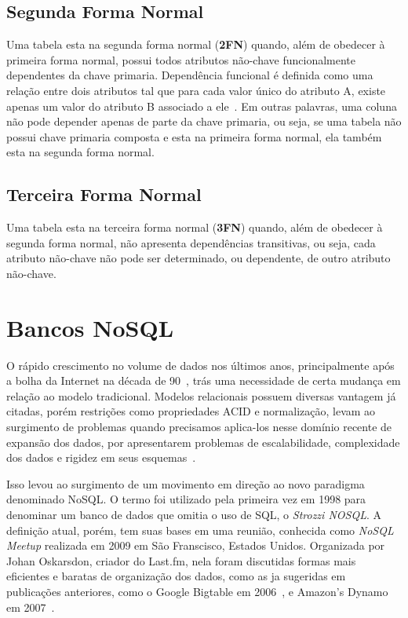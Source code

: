 \subsection*{Segunda Forma Normal}
	Uma tabela esta na segunda forma normal (\textbf{2FN}) quando, além de obedecer à primeira forma normal, possui todos atributos não-chave funcionalmente dependentes da chave primaria. Dependência funcional é definida como uma relação entre dois atributos tal que para cada valor único do atributo A, existe apenas um valor do atributo B associado a ele~\cite{jan}. Em outras palavras, uma coluna não pode depender apenas de parte da chave primaria, ou seja, se uma tabela não possui chave primaria composta e esta na primeira forma normal, ela também esta na segunda forma normal.
	
\subsection*{Terceira Forma Normal}
	Uma tabela esta na terceira forma normal (\textbf{3FN}) quando, além de obedecer à segunda forma normal, não apresenta dependências transitivas, ou seja, cada atributo não-chave não pode ser determinado, ou dependente, de outro atributo não-chave. 

\section{Bancos NoSQL}
    O rápido crescimento no volume de dados nos últimos anos, principalmente após a bolha da Internet na década de 90~\cite{pramod}, trás uma necessidade de certa mudança em relação ao modelo tradicional. Modelos relacionais possuem diversas vantagem já citadas, porém restrições como propriedades ACID e normalização, levam ao surgimento de problemas quando precisamos aplica-los nesse domínio recente de expansão dos dados, por apresentarem problemas de escalabilidade, complexidade dos dados e rigidez em seus esquemas~\cite{leavitt2010nosql}. 
    
    Isso levou ao surgimento de um movimento em direção ao novo paradigma denominado NoSQL. O termo foi utilizado pela primeira vez em 1998 para denominar um banco de dados que omitia o uso de SQL, o \emph{Strozzi NOSQL}. A definição atual, porém, tem suas bases em uma reunião, conhecida como \emph{NoSQL Meetup} realizada em 2009 em São Franscisco, Estados Unidos. Organizada por Johan Oskarsdon, criador do Last.fm, nela foram discutidas formas mais eficientes e baratas de organização dos dados, como as ja sugeridas em publicações anteriores, como o Google Bigtable em 2006~\cite{bigtable}, e Amazon's Dynamo em 2007~\cite{dynamo, chrisnosql}.
